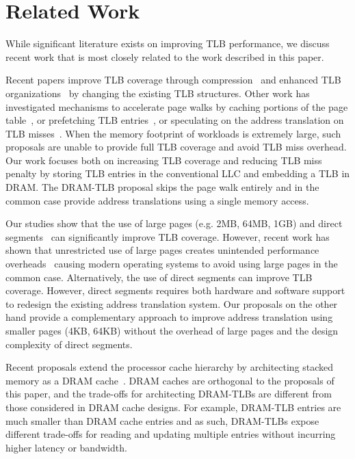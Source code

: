 \section{Related Work}

\noindent While significant literature exists on improving TLB
performance, we discuss recent work that is most closely related to
the work described in this paper.

 Recent papers improve TLB
coverage through compression~\cite{COLT, tlbreachclustering} and
enhanced TLB organizations~\cite{SharedLLT, simTLBperf} by changing
the existing TLB structures. Other work has investigated mechanisms to
accelerate page walks by caching portions of the page
table~\cite{SkipPT,MMUcaches}, or prefetching TLB
entries~\cite{prefTLBintercore, prefTLBgokul, prefTLBrecency,
power2014supporting}, or speculating on the address translation on TLB
misses~\cite{spectlb}. When the memory footprint of workloads is
extremely large, such proposals are unable to provide full TLB
coverage and avoid TLB miss overhead. Our work focuses both on
increasing TLB coverage and reducing TLB miss penalty by storing TLB
entries in the conventional LLC and embedding a TLB in DRAM. The
DRAM-TLB proposal skips the page walk entirely and in the common case
provide address translations using a single memory access.

 Our studies show
that the use of large pages (e.g. 2MB, 64MB, 1GB) and direct
segments~\cite{Basu2013} can significantly improve TLB coverage.
However, recent work has shown that unrestricted use of large pages
creates unintended performance
overheads~\cite{SuperPageProblem,TwoPageSize,numa-harmful,cameo,largepagevm}
causing modern operating systems to avoid using large pages in the
common case. Alternatively, the use of direct segments can improve TLB
coverage. However, direct segments requires both hardware and software
support to redesign the existing address translation system. Our
proposals on the other hand provide a complementary approach to
improve address translation using smaller pages (4KB, 64KB) without
the overhead of large pages and the design complexity of direct
segments. 

 Recent proposals extend
the processor cache hierarchy by architecting stacked memory as a DRAM
cache~\cite{BEAR, moin2012, unison, loh2011, jaewoong2012,
dramcache-resilient}. DRAM caches are orthogonal to the proposals of
this paper, and the trade-offs for architecting DRAM-TLBs are
different from those considered in DRAM cache designs. For example,
DRAM-TLB entries are much smaller than DRAM cache entries and as such,
DRAM-TLBs expose different trade-offs for reading and updating
multiple entries without incurring higher latency or bandwidth.

